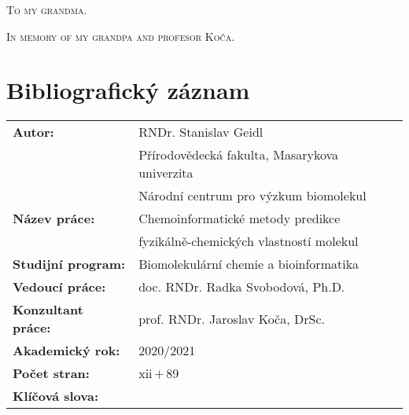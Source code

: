 \documentclass[11pt,b5paper,oneside,final]{book}
\begin{document}
\vspace{5mm}


\vspace{1cm}


\vfill


\vspace{1cm}

\normalsize
\clearpage

\begin{center}
\vspace*{9cm}
  \textsc{To my grandma.}

  \textsc{In memory of my grandpa and profesor Koča.}
\end{center}
\normalsize
\clearpage

\vfill
\section*{Bibliografický záznam}
\def\arraystretch{1.5}
\begin{tabular}{ lp{7.5cm} } 
  \textbf{Autor:}            & RNDr. Stanislav Geidl \\
                             & Přírodovědecká fakulta, Masarykova univerzita \\
                             & Národní centrum pro výzkum biomolekul \\
  \textbf{Název práce:}      & Chemoinformatické metody predikce \\
                             & fyzikálně-chemických vlastností molekul \\
  \textbf{Studijní program:} & Biomolekulární chemie a bioinformatika \\
  \textbf{Vedoucí práce:}    & doc. RNDr. Radka Svobodová, Ph.D. \\
  \textbf{Konzultant práce:} & prof. RNDr. Jaroslav Koča, DrSc. \\
  \textbf{Akademický rok:}   & 2020/2021 \\
  \textbf{Počet stran:}      & xii\,$+$\,89\\
  \textbf{Klíčová slova:}    &  \\
\end{tabular}
\normalsize
\clearpage
\end{document}
